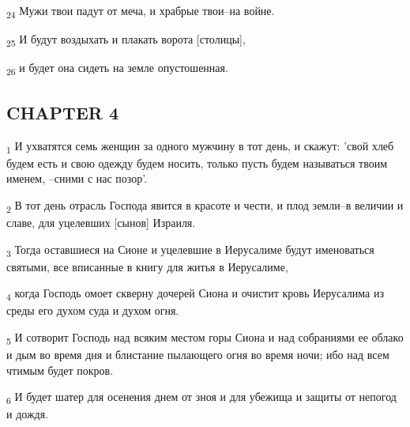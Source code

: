 \begin{tcolorbox}
\textsubscript{24} Мужи твои падут от меча, и храбрые твои--на войне.
\end{tcolorbox}
\begin{tcolorbox}
\textsubscript{25} И будут воздыхать и плакать ворота [столицы],
\end{tcolorbox}
\begin{tcolorbox}
\textsubscript{26} и будет она сидеть на земле опустошенная.
\end{tcolorbox}
\subsection{CHAPTER 4}
\begin{tcolorbox}
\textsubscript{1} И ухватятся семь женщин за одного мужчину в тот день, и скажут: 'свой хлеб будем есть и свою одежду будем носить, только пусть будем называться твоим именем, --сними с нас позор'.
\end{tcolorbox}
\begin{tcolorbox}
\textsubscript{2} В тот день отрасль Господа явится в красоте и чести, и плод земли--в величии и славе, для уцелевших [сынов] Израиля.
\end{tcolorbox}
\begin{tcolorbox}
\textsubscript{3} Тогда оставшиеся на Сионе и уцелевшие в Иерусалиме будут именоваться святыми, все вписанные в книгу для житья в Иерусалиме,
\end{tcolorbox}
\begin{tcolorbox}
\textsubscript{4} когда Господь омоет скверну дочерей Сиона и очистит кровь Иерусалима из среды его духом суда и духом огня.
\end{tcolorbox}
\begin{tcolorbox}
\textsubscript{5} И сотворит Господь над всяким местом горы Сиона и над собраниями ее облако и дым во время дня и блистание пылающего огня во время ночи; ибо над всем чтимым будет покров.
\end{tcolorbox}
\begin{tcolorbox}
\textsubscript{6} И будет шатер для осенения днем от зноя и для убежища и защиты от непогод и дождя.
\end{tcolorbox}
